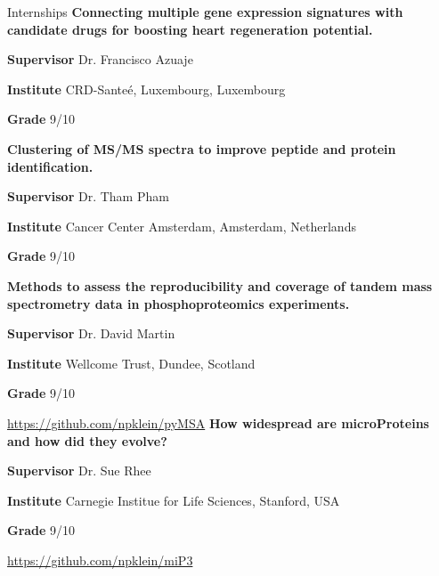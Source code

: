 \begin{rubric}{Internships}
%
%
%
	\textbf{Connecting multiple gene expression signatures with candidate drugs for boosting heart regeneration potential.} \par
	\textbf{Supervisor} Dr. Francisco Azuaje \par
	\textbf{Institute} CRD-Sante\'e, Luxembourg, Luxembourg \par
	\textbf{Grade} 9/10 \par
%
%
\textbf{Clustering of MS/MS spectra to improve peptide and protein identification.} \par
\textbf{Supervisor} Dr. Tham Pham \par
\textbf{Institute} Cancer Center Amsterdam, Amsterdam, Netherlands\par
\textbf{Grade} 9/10 \par
%
\textbf{Methods to assess the reproducibility and coverage of tandem mass spectrometry data in phosphoproteomics experiments.} \par
\textbf{Supervisor} Dr. David Martin \par
\textbf{Institute} Wellcome Trust, Dundee, Scotland \par
\textbf{Grade} 9/10 \par
\url{https://github.com/npklein/pyMSA}
%
%
\textbf{How widespread are microProteins and how did they evolve?} \par
\textbf{Supervisor} Dr. Sue Rhee \par
\textbf{Institute} Carnegie Institue for Life Sciences, Stanford, USA \par
\textbf{Grade} 9/10 \par
\url{https://github.com/npklein/miP3}
%
\end{rubric}